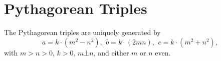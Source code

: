 \begin{comment}
	\subsection{Bézout's identity}
	For $a \neq $, $b \neq 0$, then $d=\gcd(a,b)$ is the smallest positive integer for which there are integer solutions to
	$$ax+by=d$$
	If $(x,y)$ is one solution, then all solutions are given by
	$$\left(x+\frac{kb}{\gcd(a,b)}, y-\frac{ka}{\gcd(a,b)}\right), \quad k\in\mathbb{Z}$$
\end{comment}

	
\section{Pythagorean Triples}
	 The Pythagorean triples are uniquely generated by
	 \[ a=k\cdot (m^{2}-n^{2}),\ \,b=k\cdot (2mn),\ \,c=k\cdot (m^{2}+n^{2}), \]
	 with $m > n > 0$, $k > 0$, $m \bot n$, and either $m$ or $n$ even.